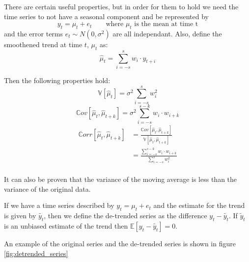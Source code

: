 \documentclass[12pt]{article}
\begin{document}
        There are certain useful properties, but in order for them to hold we need
        the time series to not have a seasonal component and be represented by
        \begin{equation*}
            y_t = \mu_t + e_t \qquad \text{where $\mu_t$ is the mean at time t}
        \end{equation*}
        and the error terms $e_t \sim N(0, \sigma^2)$ are all independant.
        Also, define the smoothened trend at time $t$, $\mu_t$ as:
        \begin{equation*}
            \hat{\mu}_t = \sum_{i = -s}^s w_i \cdot y_{t + i}
        \end{equation*}

        Then the following properties hold:
        \begin{equation*}
            \mathbb{V}[\hat{\mu}_t] = \sigma^2 \sum_{i = -s}^{s} w^2_i
        \end{equation*}
        \begin{equation*}
            \mathbb{C}ov[\hat{\mu}_t, \hat{\mu}_{t+k}] = 
                \sigma^2 \sum_{i = -s}^{s-k} w_i \cdot w_{i+k}
        \end{equation*}
        \begin{equation*}
            \begin{aligned}
                \mathbb{C}orr[\hat{\mu}_t, \hat{\mu}_{t+k}] &= 
                \frac{\mathbb{C}ov[\hat{\mu}_t, \hat{\mu}_{t+k}]}{
                    \mathbb{V}[\hat{\mu}_t, \hat{\mu}_{t+k}]} \\
                &= \frac{
                        \sum_{i = -s}^{s-k} w_i \cdot w_{i+k}
                    }{ 
                        \sum_{i = -s}^{s} w^2_i
                    }\\
            \end{aligned}
        \end{equation*}
        
        It can also be proven that the variance of the moving average is less than the 
        variance of the original data.

        If we have a time series described by $y_t = \mu_t + e_t$ and the estimate
        for the trend is given by $\tilde{y_t}$, then we define the de-trended series
        as the difference $y_t - \tilde{y_t}$. If $\tilde{y}_t$ is an unbiased estimate
        of the trend then $\mathbb{E}[y_t - \tilde{y_t}] = 0$.

        An example of the original series and the de-trended series is shown in figure
        \ref{fig:detrended_series}
\end{document}
